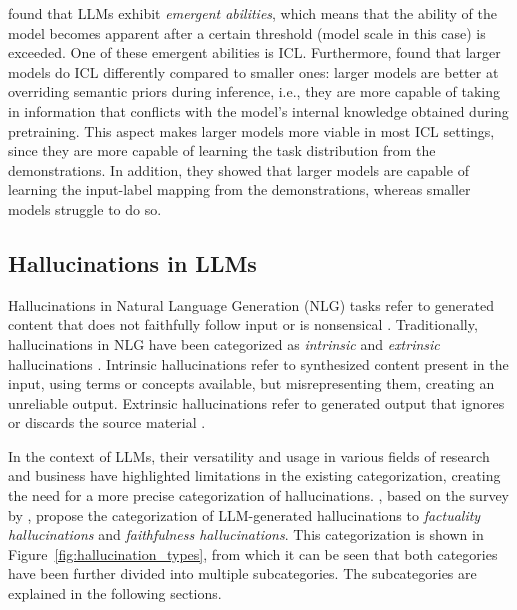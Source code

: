 \documentclass[english, 12pt, a4paper, sci, utf8, a-2b, online]{latex/definitions/aaltothesis}
\begin{document}
\textcite{wei2022emergentabilitieslargelanguage} found that LLMs exhibit \textit{emergent abilities}, which means that the ability of the model becomes apparent after a certain threshold (model scale in this case) is exceeded. One of these emergent abilities is ICL. Furthermore, \textcite{wei2023largerlanguagemodelsincontext} found that larger models do ICL differently compared to smaller ones: larger models are better at overriding semantic priors during inference, i.e., they are more capable of taking in information that conflicts with the model's internal knowledge obtained during pretraining. This aspect makes larger models more viable in most ICL settings, since they are more capable of learning the task distribution from the demonstrations. In addition, they showed that larger models are capable of learning the input-label mapping from the demonstrations, whereas smaller models struggle to do so.

\subsection{Hallucinations in LLMs} \label{sec:hallcinations}

Hallucinations in Natural Language Generation (NLG) tasks refer to generated content that does not faithfully follow input or is nonsensical \cite{filippova-2020-controlled}. Traditionally, hallucinations in NLG have been categorized as \textit{intrinsic} and \textit{extrinsic} hallucinations \cite{maynez2020faithfulnessfactualityabstractivesummarization}. Intrinsic hallucinations refer to synthesized content present in the input, using terms or concepts available, but misrepresenting them, creating an unreliable output. Extrinsic hallucinations refer to generated output that ignores or discards the source material \cite{10.1145/3571730}.

In the context of LLMs, their versatility and usage in various fields of research and business have highlighted limitations in the existing categorization, creating the need for a more precise categorization of hallucinations. \textcite{10.1145/3703155}, based on the survey by \textcite{10.1145/3571730}, propose the categorization of LLM-generated hallucinations to \textit{factuality hallucinations} and \textit{faithfulness hallucinations}. This categorization is shown in Figure~\ref{fig:hallucination_types}, from which it can be seen that both categories have been further divided into multiple subcategories. The subcategories are explained in the following sections.
\end{document}
